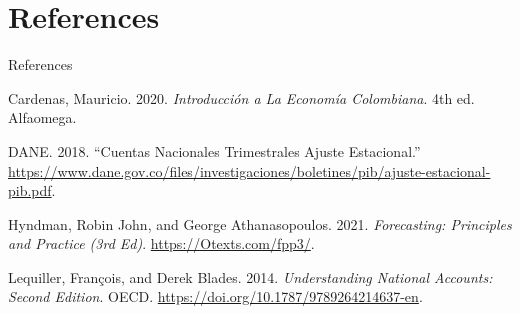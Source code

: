 \documentclass[
  ignorenonframetext,
]{beamer}
\newlength{\cslhangindent}
\newenvironment{CSLReferences}[2] %
 {\begin{list}{}{%
  \setlength{\itemindent}{0pt}
  \setlength{\leftmargin}{0pt}
  \setlength{\parsep}{0pt}
  \ifodd #1
   \setlength{\leftmargin}{\cslhangindent}
   \setlength{\itemindent}{-1\cslhangindent}
  \fi
  \setlength{\itemsep}{#2\baselineskip}}}
 {\end{list}}
\begin{document}
\section*{References}\label{references}

\begin{frame}[allowframebreaks]{References}
\label{refs}
\begin{CSLReferences}{1}{0}
Cardenas, Mauricio. 2020. \emph{Introducción a La {Economía}
{Colombiana}}. 4th ed. Alfaomega.

DANE. 2018. {``Cuentas {Nacionales} {Trimestrales} {Ajuste}
{Estacional}.''}
\url{https://www.dane.gov.co/files/investigaciones/boletines/pib/ajuste-estacional-pib.pdf}.

Hyndman, Robin John, and George Athanasopoulos. 2021. \emph{Forecasting:
{Principles} and {Practice} (3rd Ed)}. \url{https://Otexts.com/fpp3/}.

Lequiller, François, and Derek Blades. 2014. \emph{Understanding
{National} {Accounts}: {Second} {Edition}}. OECD.
\url{https://doi.org/10.1787/9789264214637-en}.

\end{CSLReferences}
\end{frame}
\end{document}
